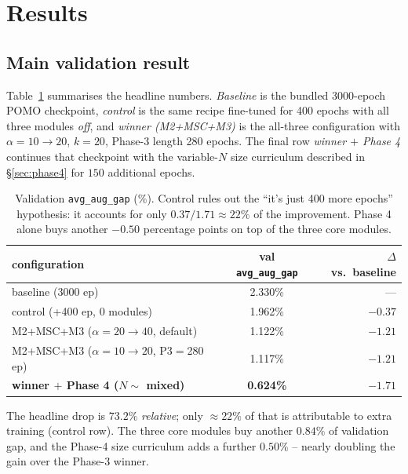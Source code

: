 \documentclass[11pt,a4paper]{article}
\begin{document}
\section{Results}
\label{sec:results}

\subsection{Main validation result}

Table~\ref{tab:main} summarises the headline numbers. \textit{Baseline} is
the bundled 3000-epoch POMO checkpoint, \textit{control} is the same recipe
fine-tuned for 400 epochs with all three modules \emph{off}, and
\textit{winner (M2+MSC+M3)} is the all-three configuration with
$\alpha=10\!\to\!20$, $k=20$, Phase-3 length 280 epochs. The final row
\textit{winner $+$ Phase 4} continues that checkpoint with the variable-$N$
size curriculum described in \S\ref{sec:phase4} for $150$ additional epochs.

\begin{table}[t]
\centering
\caption{Validation \texttt{avg\_aug\_gap} ($\%$). Control rules out the
``it's just 400 more epochs'' hypothesis: it accounts for only
$0.37/1.71 \approx 22\%$ of the improvement. Phase 4 alone buys another
$-0.50$ percentage points on top of the three core modules.}
\label{tab:main}
\small
\begin{tabular}{l c r}
\toprule
configuration & val \texttt{avg\_aug\_gap} & $\Delta$ vs.\ baseline\\
\midrule
baseline (3000 ep)                                     & 2.330\% & --- \\
control (+400 ep, 0 modules)                           & 1.962\% & $-0.37$ \\
M2+MSC+M3 ($\alpha\!=\!20\!\to\!40$, default)          & 1.122\% & $-1.21$ \\
M2+MSC+M3 ($\alpha\!=\!10\!\to\!20$, P3$=$280 ep)      & 1.117\% & $-1.21$ \\
\rowcolor{sdmblue!10}
\textbf{winner $+$ Phase 4 ($N\!\sim$ mixed)}          & \textbf{0.624\%} & $\mathbf{-1.71}$ \\
\bottomrule
\end{tabular}
\end{table}

The headline drop is $73.2\%$ \emph{relative}; only $\approx 22\%$ of that is
attributable to extra training (control row). The three core modules buy
another $0.84\%$ of validation gap, and the Phase-4 size curriculum adds a
further $0.50\%$ -- nearly doubling the gain over the Phase-3 winner.
\end{document}
